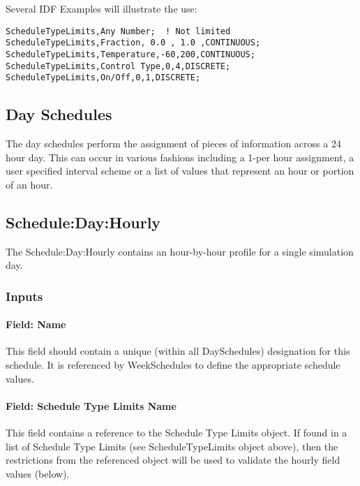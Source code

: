 Several IDF Examples will illustrate the use:

\begin{lstlisting}
ScheduleTypeLimits,Any Number;  ! Not limited
ScheduleTypeLimits,Fraction, 0.0 , 1.0 ,CONTINUOUS;
ScheduleTypeLimits,Temperature,-60,200,CONTINUOUS;
ScheduleTypeLimits,Control Type,0,4,DISCRETE;
ScheduleTypeLimits,On/Off,0,1,DISCRETE;
\end{lstlisting}

\subsection{Day Schedules}\label{day-schedules}

The day schedules perform the assignment of pieces of information across a 24 hour day. This can occur in various fashions including a 1-per hour assignment, a user specified interval scheme or a list of values that represent an hour or portion of an hour.

\subsection{Schedule:Day:Hourly}\label{scheduledayhourly}

The Schedule:Day:Hourly contains an hour-by-hour profile for a single simulation day.

\subsubsection{Inputs}\label{inputs-1-039}

\paragraph{Field: Name}\label{field-name-1-038}

This field should contain a unique (within all DaySchedules) designation for this schedule. It is referenced by WeekSchedules to define the appropriate schedule values.

\paragraph{Field: Schedule Type Limits Name}\label{field-schedule-type-limits-name-000}

This field contains a reference to the Schedule Type Limits object. If found in a list of Schedule Type Limits (see ScheduleTypeLimits object above), then the restrictions from the referenced object will be used to validate the hourly field values (below).

